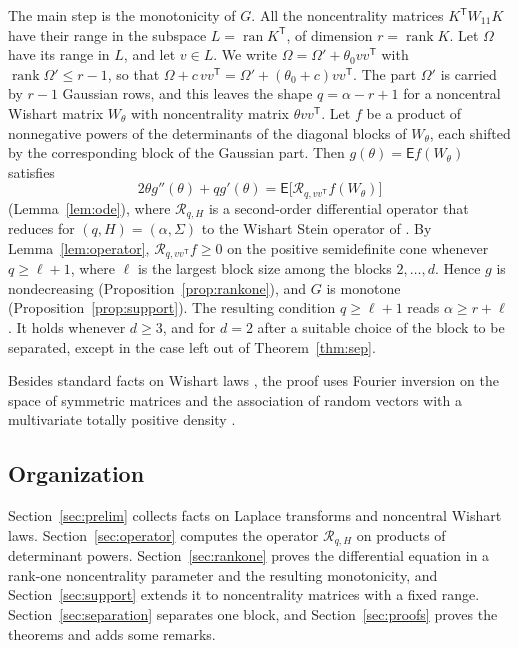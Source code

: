 \documentclass{amsart}
\theoremstyle{definition}
\theoremstyle{remark}
\numberwithin{equation}{section}
\newcommand{\E}{\mathsf{E}}
\newcommand{\Rop}{\mathcal{R}}
\newcommand{\ran}{\operatorname{ran}}
\newcommand{\rank}{\operatorname{rank}}
\begin{document}
The main step is the monotonicity of $G$. All the noncentrality matrices $K^{\mathsf T}W_{11}K$ have their range in the subspace $L=\ran K^{\mathsf T}$, of dimension $r=\rank K$. Let $\Omega$ have its range in $L$, and let $v\in L$. We write $\Omega=\Omega'+\theta_0vv^{\mathsf T}$ with $\rank\Omega'\le r-1$, so that $\Omega+c\,vv^{\mathsf T}=\Omega'+(\theta_0+c)vv^{\mathsf T}$. The part $\Omega'$ is carried by $r-1$ Gaussian rows, and this leaves the shape $q=\alpha-r+1$ for a noncentral Wishart matrix $W_\theta$ with noncentrality matrix $\theta vv^{\mathsf T}$. Let $f$ be a product of nonnegative powers of the determinants of the diagonal blocks of $W_\theta$, each shifted by the corresponding block of the Gaussian part. Then $g(\theta)=\E f(W_\theta)$ satisfies
\[
2\theta g''(\theta)+qg'(\theta)=\E\bigl[\Rop_{q,vv^{\mathsf T}}f(W_\theta)\bigr]
\]
(Lemma~\ref{lem:ode}), where $\Rop_{q,H}$ is a second-order differential operator that reduces for $(q,H)=(\alpha,\Sigma)$ to the Wishart Stein operator of \cite{BGORS26,GO26}. By Lemma~\ref{lem:operator}, $\Rop_{q,vv^{\mathsf T}}f\ge0$ on the positive semidefinite cone whenever $q\ge\ell+1$, where $\ell$ is the largest block size among the blocks $2,\dots,d$. Hence $g$ is nondecreasing (Proposition~\ref{prop:rankone}), and $G$ is monotone (Proposition~\ref{prop:support}). The resulting condition $q\ge\ell+1$ reads $\alpha\ge r+\ell$. It holds whenever $d\ge3$, and for $d=2$ after a suitable choice of the block to be separated, except in the case left out of Theorem~\ref{thm:sep}.

Besides standard facts on Wishart laws \cite{Mui82}, the proof uses Fourier inversion on the space of symmetric matrices and the association of random vectors with a multivariate totally positive density \cite{FKG71,KR80}.

\subsection*{Organization}
Section~\ref{sec:prelim} collects facts on Laplace transforms and noncentral Wishart laws. Section~\ref{sec:operator} computes the operator $\Rop_{q,H}$ on products of determinant powers. Section~\ref{sec:rankone} proves the differential equation in a rank-one noncentrality parameter and the resulting monotonicity, and Section~\ref{sec:support} extends it to noncentrality matrices with a fixed range. Section~\ref{sec:separation} separates one block, and Section~\ref{sec:proofs} proves the theorems and adds some remarks.
\end{document}
